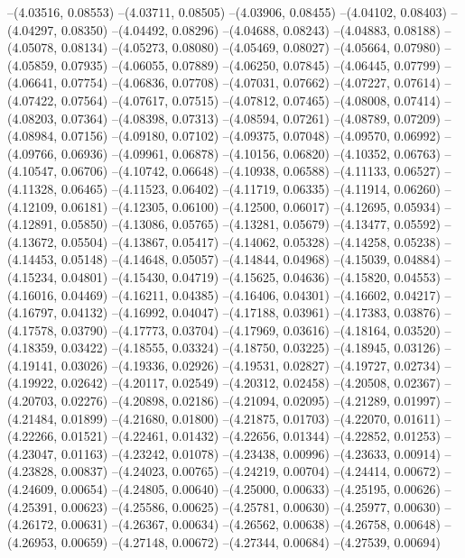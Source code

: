 --(4.03516, 0.08553)
--(4.03711, 0.08505)
--(4.03906, 0.08455)
--(4.04102, 0.08403)
--(4.04297, 0.08350)
--(4.04492, 0.08296)
--(4.04688, 0.08243)
--(4.04883, 0.08188)
--(4.05078, 0.08134)
--(4.05273, 0.08080)
--(4.05469, 0.08027)
--(4.05664, 0.07980)
--(4.05859, 0.07935)
--(4.06055, 0.07889)
--(4.06250, 0.07845)
--(4.06445, 0.07799)
--(4.06641, 0.07754)
--(4.06836, 0.07708)
--(4.07031, 0.07662)
--(4.07227, 0.07614)
--(4.07422, 0.07564)
--(4.07617, 0.07515)
--(4.07812, 0.07465)
--(4.08008, 0.07414)
--(4.08203, 0.07364)
--(4.08398, 0.07313)
--(4.08594, 0.07261)
--(4.08789, 0.07209)
--(4.08984, 0.07156)
--(4.09180, 0.07102)
--(4.09375, 0.07048)
--(4.09570, 0.06992)
--(4.09766, 0.06936)
--(4.09961, 0.06878)
--(4.10156, 0.06820)
--(4.10352, 0.06763)
--(4.10547, 0.06706)
--(4.10742, 0.06648)
--(4.10938, 0.06588)
--(4.11133, 0.06527)
--(4.11328, 0.06465)
--(4.11523, 0.06402)
--(4.11719, 0.06335)
--(4.11914, 0.06260)
--(4.12109, 0.06181)
--(4.12305, 0.06100)
--(4.12500, 0.06017)
--(4.12695, 0.05934)
--(4.12891, 0.05850)
--(4.13086, 0.05765)
--(4.13281, 0.05679)
--(4.13477, 0.05592)
--(4.13672, 0.05504)
--(4.13867, 0.05417)
--(4.14062, 0.05328)
--(4.14258, 0.05238)
--(4.14453, 0.05148)
--(4.14648, 0.05057)
--(4.14844, 0.04968)
--(4.15039, 0.04884)
--(4.15234, 0.04801)
--(4.15430, 0.04719)
--(4.15625, 0.04636)
--(4.15820, 0.04553)
--(4.16016, 0.04469)
--(4.16211, 0.04385)
--(4.16406, 0.04301)
--(4.16602, 0.04217)
--(4.16797, 0.04132)
--(4.16992, 0.04047)
--(4.17188, 0.03961)
--(4.17383, 0.03876)
--(4.17578, 0.03790)
--(4.17773, 0.03704)
--(4.17969, 0.03616)
--(4.18164, 0.03520)
--(4.18359, 0.03422)
--(4.18555, 0.03324)
--(4.18750, 0.03225)
--(4.18945, 0.03126)
--(4.19141, 0.03026)
--(4.19336, 0.02926)
--(4.19531, 0.02827)
--(4.19727, 0.02734)
--(4.19922, 0.02642)
--(4.20117, 0.02549)
--(4.20312, 0.02458)
--(4.20508, 0.02367)
--(4.20703, 0.02276)
--(4.20898, 0.02186)
--(4.21094, 0.02095)
--(4.21289, 0.01997)
--(4.21484, 0.01899)
--(4.21680, 0.01800)
--(4.21875, 0.01703)
--(4.22070, 0.01611)
--(4.22266, 0.01521)
--(4.22461, 0.01432)
--(4.22656, 0.01344)
--(4.22852, 0.01253)
--(4.23047, 0.01163)
--(4.23242, 0.01078)
--(4.23438, 0.00996)
--(4.23633, 0.00914)
--(4.23828, 0.00837)
--(4.24023, 0.00765)
--(4.24219, 0.00704)
--(4.24414, 0.00672)
--(4.24609, 0.00654)
--(4.24805, 0.00640)
--(4.25000, 0.00633)
--(4.25195, 0.00626)
--(4.25391, 0.00623)
--(4.25586, 0.00625)
--(4.25781, 0.00630)
--(4.25977, 0.00630)
--(4.26172, 0.00631)
--(4.26367, 0.00634)
--(4.26562, 0.00638)
--(4.26758, 0.00648)
--(4.26953, 0.00659)
--(4.27148, 0.00672)
--(4.27344, 0.00684)
--(4.27539, 0.00694)
